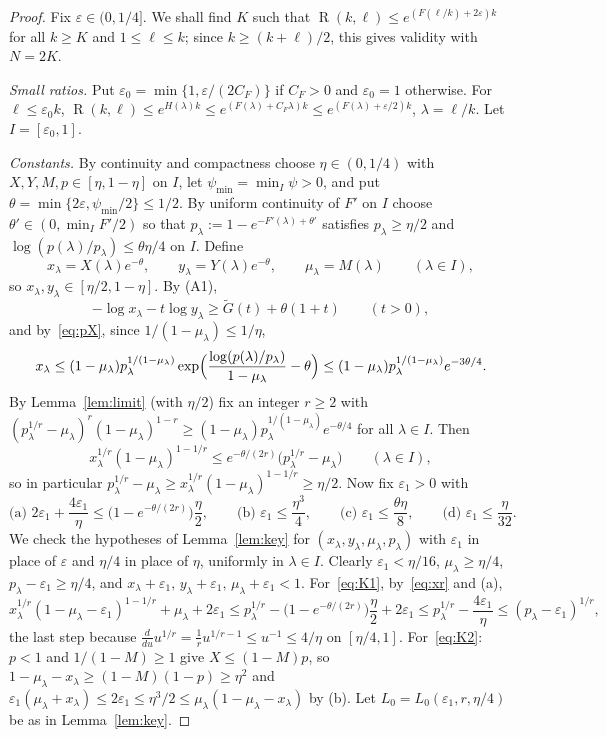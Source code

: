 \documentclass[11pt]{article}
\theoremstyle{definition}
\newcommand{\Gt}{\widetilde G}
\newcommand{\eps}{\varepsilon}
\newcommand{\lam}{\lambda}
\DeclareMathOperator{\Ram}{R}
\begin{document}
\begin{proof}
Fix $\eps\in(0,1/4]$.  We shall find $K$ such that $\Ram(k,\ell)\le e^{(F(\ell/k)+2\eps)k}$ for all $k\ge K$ and $1\le\ell\le k$; since $k\ge(k+\ell)/2$, this gives validity with $N=2K$.

\smallskip\noindent\emph{Small ratios.}  Put $\eps_0=\min\{1,\eps/(2C_F)\}$ if $C_F>0$ and $\eps_0=1$ otherwise.  For $\ell\le\eps_0k$, $\Ram(k,\ell)\le e^{H(\lam)k}\le e^{(F(\lam)+C_F\lam)k}\le e^{(F(\lam)+\eps/2)k}$, $\lam=\ell/k$.  Let $I=[\eps_0,1]$.

\smallskip\noindent\emph{Constants.}  By continuity and compactness choose $\eta\in(0,1/4)$ with $X,Y,M,p\in[\eta,1-\eta]$ on $I$, let $\psi_{\min}=\min_I\psi>0$, and put $\theta=\min\{2\eps,\psi_{\min}/2\}\le1/2$.  By uniform continuity of $F'$ on $I$ choose $\theta'\in(0,\min_IF'/2)$ so that $p_\lam:=1-e^{-F'(\lam)+\theta'}$ satisfies $p_\lam\ge\eta/2$ and $\log(p(\lam)/p_\lam)\le\theta\eta/4$ on $I$.  Define
\[
x_\lam=X(\lam)e^{-\theta},\qquad y_\lam=Y(\lam)e^{-\theta},\qquad\mu_\lam=M(\lam)\qquad(\lam\in I),
\]
so $x_\lam,y_\lam\in[\eta/2,1-\eta]$.  By (A1),
\begin{equation}\label{eq:regmargin}
-\log x_\lam-t\log y_\lam\ge\Gt(t)+\theta(1+t)\qquad(t>0),
\end{equation}
and by~\eqref{eq:pX}, since $1/(1-\mu_\lam)\le1/\eta$,
\[
x_\lam\le(1-\mu_\lam)p_\lam^{1/(1-\mu_\lam)}\exp\Bigl(\frac{\log(p(\lam)/p_\lam)}{1-\mu_\lam}-\theta\Bigr)\le(1-\mu_\lam)p_\lam^{1/(1-\mu_\lam)}e^{-3\theta/4}.
\]
By Lemma~\ref{lem:limit} (with $\eta/2$) fix an integer $r\ge2$ with $(p_\lam^{1/r}-\mu_\lam)^r(1-\mu_\lam)^{1-r}\ge(1-\mu_\lam)p_\lam^{1/(1-\mu_\lam)}e^{-\theta/4}$ for all $\lam\in I$.  Then
\begin{equation}\label{eq:xr}
x_\lam^{1/r}(1-\mu_\lam)^{1-1/r}\le e^{-\theta/(2r)}\bigl(p_\lam^{1/r}-\mu_\lam\bigr)\qquad(\lam\in I),
\end{equation}
so in particular $p_\lam^{1/r}-\mu_\lam\ge x_\lam^{1/r}(1-\mu_\lam)^{1-1/r}\ge\eta/2$.  Now fix $\eps_1>0$ with
\[
\text{(a) } 2\eps_1+\frac{4\eps_1}\eta\le\bigl(1-e^{-\theta/(2r)}\bigr)\frac\eta2,\qquad\text{(b) }\eps_1\le\frac{\eta^3}4,\qquad\text{(c) }\eps_1\le\frac{\theta\eta}8,\qquad\text{(d) }\eps_1\le\frac\eta{32}.
\]
We check the hypotheses of Lemma~\ref{lem:key} for $(x_\lam,y_\lam,\mu_\lam,p_\lam)$ with $\eps_1$ in place of $\eps$ and $\eta/4$ in place of $\eta$, uniformly in $\lam\in I$.  Clearly $\eps_1<\eta/16$, $\mu_\lam\ge\eta/4$, $p_\lam-\eps_1\ge\eta/4$, and $x_\lam+\eps_1,\,y_\lam+\eps_1,\,\mu_\lam+\eps_1<1$.  For~\eqref{eq:K1}, by~\eqref{eq:xr} and (a),
\[
x_\lam^{1/r}(1-\mu_\lam-\eps_1)^{1-1/r}+\mu_\lam+2\eps_1\le p_\lam^{1/r}-\bigl(1-e^{-\theta/(2r)}\bigr)\frac\eta2+2\eps_1\le p_\lam^{1/r}-\frac{4\eps_1}\eta\le(p_\lam-\eps_1)^{1/r},
\]
the last step because $\frac{d}{du}u^{1/r}=\frac1ru^{1/r-1}\le u^{-1}\le4/\eta$ on $[\eta/4,1]$.  For~\eqref{eq:K2}: $p<1$ and $1/(1-M)\ge1$ give $X\le(1-M)p$, so $1-\mu_\lam-x_\lam\ge(1-M)(1-p)\ge\eta^2$ and $\eps_1(\mu_\lam+x_\lam)\le2\eps_1\le\eta^3/2\le\mu_\lam(1-\mu_\lam-x_\lam)$ by (b).  Let $L_0=L_0(\eps_1,r,\eta/4)$ be as in Lemma~\ref{lem:key}.


\end{proof}
\end{document}
